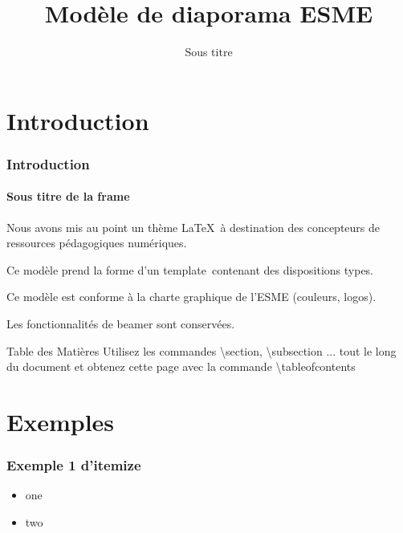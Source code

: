 \documentclass[aspectratio=169]{beamer}
\title{Modèle de diaporama ESME}
\subtitle{Sous titre}
\date[]{}
\author[]{}
\begin{document}
\begin{frame}
\titlepage
\end{frame}

\section{Introduction}


\begin{frame} 
\frametitle{Introduction} 
\framesubtitle{Sous titre de la frame} 

Nous avons mis au point un thème \LaTeX~à destination des concepteurs de 
ressources pédagogiques numériques.\newline

Ce modèle prend la forme d'un \og template\fg~contenant des 
dispositions types.\newline

Ce modèle est conforme à la charte graphique de l'ESME (couleurs, logos).\newline

Les fonctionnalités de beamer sont conservées.

\end{frame}

\begin{frame}{Table des Matières}
    \tableofcontents
    \scriptsize
    Utilisez les commandes \textbackslash section, \textbackslash subsection ...
    tout le long du document et obtenez cette page avec la commande 
    \textbackslash tableofcontents
\end{frame}

\section{Exemples}

\begin{frame}
    \frametitle{Exemple 1 d'itemize}
\begin{itemize}
\item one
\item two
\end{itemize}
\end{frame}
\end{document}
